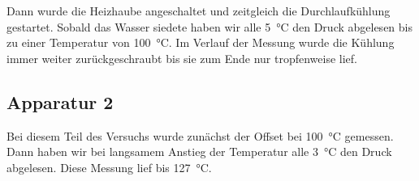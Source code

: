 Dann wurde die Heizhaube angeschaltet und zeitgleich die Durchlaufkühlung gestartet. Sobald das Wasser
siedete haben wir alle \SI{5}{\celsius} den Druck abgelesen bis zu einer Temperatur von \SI{100}{\celsius}.
Im Verlauf der Messung wurde die Kühlung immer weiter zurückgeschraubt bis sie zum Ende nur tropfenweise
lief.

\subsection{Apparatur 2}

Bei diesem Teil des Versuchs wurde zunächst der Offset bei \SI{100}{\celsius} gemessen. Dann haben wir bei
langsamem Anstieg der Temperatur alle \SI{3}{\celsius} den Druck abgelesen. Diese Messung lief bis \SI{127}{\celsius}.

\newpage
